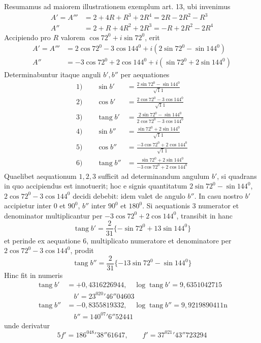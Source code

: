 Resumamus ad maiorem illustrationem exemplum art. 13, ubi invenimus
\[
\begin{aligned}
A'=A'''&=2+4R+R^3+2R^4=2R-2R^2-R^3\\
A''&=2+R+4R^2+2R^3=-R+2R^2-2R^4
\end{aligned}
\]
Accipiendo pro $R$ valorem $\cos72^0+i\sin72^0$, erit
\[
\begin{aligned}
A'=A'''&=2\cos72^0-3\cos144^0+i(2\sin72^0-\sin144^0)\\
A''&=-3\cos72^0+2\cos144^0+i(\sin72^0+2\sin144^0)
\end{aligned}
\]
Determinabuntur itaque anguli $b',b''$ per aequationes
\[
\begin{aligned}
1)\qquad\sin b'&=\frac{2\sin72^0-\sin144^0}{\surd11}\\
2)\qquad\cos b'&=\frac{2\cos72^0-3\cos144^0}{\surd11}\\
3)\qquad\operatorname{tang}b'&=\frac{2\sin72^0-\sin144^0}{2\cos72^0-3\cos144^0}\\
4)\qquad\sin b''&=\frac{\sin72^0+2\sin144^0}{\surd11}\\
5)\qquad\cos b''&=\frac{-3\cos72^0+2\cos144^0}{\surd11}\\
6)\qquad\operatorname{tang}b''&=\frac{\sin72^0+2\sin144^0}{-3\cos72^0+2\cos144^0}
\end{aligned}
\]
Quaelibet aequationum $1,2,3$ sufficit ad determinandum angulum $b'$, si quadrans in quo accipiendus est innotuerit; hoc e signis quantitatum $2\sin72^0-\sin144^0$, $2\cos72^0-3\cos144^0$ decidi debebit: idem valet de angulo $b''$. In casu nostro $b'$ accipietur inter $0$ et $90^0$, $b''$ inter $90^0$ et $180^0$. Si aequationis $3$ numerator et denominator multiplicantur per $-3\cos72^0+2\cos144^0$, transibit in hanc
\[
\operatorname{tang}b'=\frac2{31}\{-\sin72^0+13\sin144^0\}
\]
et perinde ex aequatione $6$, multiplicato numeratore et denominatore per $2\cos72^0-3\cos144^0$, prodit
\[
\operatorname{tang}b''=\frac2{31}\{-13\sin72^0-\sin144^0\}
\]
Hinc fit in numeris
\[
\begin{aligned}
\operatorname{tang}b'&=+0{,}4316226944,\quad\log\operatorname{tang}b'=9{,}6351042715\\
&\hspace{1em}b'=23^020'46''04603\\
\operatorname{tang}b''&=-0{,}8355819332,\quad\log\operatorname{tang}b''=9{,}9219890411\mathrm n\\
&\hspace{1em}b''=140^07'6''52441
\end{aligned}
\]
unde derivatur
\[
5f'=186^048'38''61647,\qquad f'=37^021'43''723294
\]

